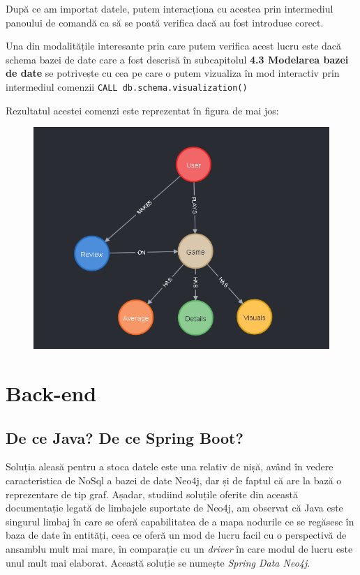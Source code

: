 \documentclass[12pt,a4paper]{report}
\begin{document}
După ce am importat datele, putem interacționa cu acestea prin intermediul panoului de comandă ca să se poată verifica dacă au fost introduse corect.

Una din modalitățile interesante prin care putem verifica acest lucru este dacă schema bazei de date care a fost descrisă în subcapitolul \textbf{4.3 Modelarea bazei de date } se potrivește cu cea pe care o putem vizualiza în mod interactiv prin intermediul comenzii \texttt{CALL db.schema.visualization()}

Rezultatul acestei comenzi este reprezentat în figura de mai jos:

\begin{figure}[H]
\centering
\caption{}
\includegraphics[scale = 0.7]{exemplu_16_schema}
\caption*{}
\end{figure}



\section{Back-end}

\subsection{De ce Java? De ce Spring Boot?}

Soluția aleasă pentru a stoca datele este una relativ de nișă, având în vedere caracteristica de NoSql a bazei de date Neo4j, dar și de faptul că are la bază o reprezentare de tip graf. Așadar, studiind soluțile oferite din această documentație \cite{20} legată de limbajele suportate de Neo4j, am observat că Java este singurul limbaj în care se oferă capabilitatea de a mapa nodurile ce se regăsesc în baza de date în entități, ceea ce oferă un mod de lucru facil cu o perspectivă de ansamblu mult mai mare, în comparație cu un \emph{driver} în care modul de lucru este unul mult mai elaborat. Această soluție se numește \emph{Spring Data Neo4j}. \cite{21}
\end{document}
